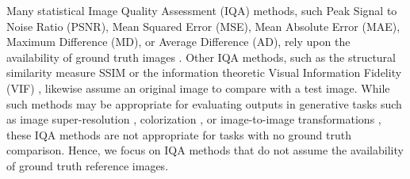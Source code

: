 Many statistical Image Quality Assessment (IQA) methods, such Peak Signal to Noise Ratio (PSNR), Mean Squared Error (MSE), Mean Absolute Error (MAE), Maximum Difference (MD), or Average Difference (AD), rely upon the availability of ground truth images \cite{patil2015survey}.
Other IQA methods, such as the structural similarity measure SSIM \cite{wang2004image} or the information theoretic Visual Information Fidelity (VIF) \cite{sheikh2006image}, likewise assume an original image to compare with a test image.
While such methods may be appropriate for evaluating outputs in generative tasks such as image super-resolution \cite{ledig2016photo}, colorization \cite{isola2017image}, or image-to-image transformations \cite{zhu2017unpaired}, these IQA methods are not appropriate for tasks with no ground truth comparison.
Hence, we focus on IQA methods that do not assume the availability of ground truth reference images.